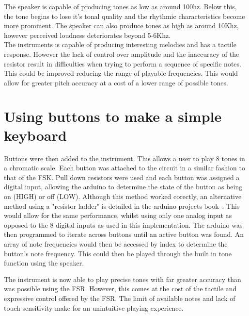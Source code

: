 \documentclass[titlepage]{scrartcl}
\begin{document}
    \begin{figure}[H]
    \end{figure}

    The speaker is capable of producing tones as low as around 100hz. Below
    this, the tone begins to lose it's tonal quality and the rhythmic
    characteristics become more prominent. The speaker can also produce tones
    as high as around 10Khz, however perceived loudness deteriorates beyond
    5-6Khz.\\
    The instruments is capable of producing interesting melodies and has a
    tactile response. However the lack of control over amplitude and the
    inaccuracy of the resistor result in difficulties when trying to perform a
    sequence of specific notes. This could be improved reducing the range of
    playable frequencies. This would allow for greater pitch accuracy at a cost
    of a lower range of possible tones.

    \section{Using buttons to make a simple keyboard}
    Buttons were then added to the instrument. This allows a user to play 8
    tones in a chromatic scale. Each button was attached to the circuit in a
    similar fashion to that of the FSK. Pull down resistors were used and each
    button was assigned a digital input, allowing the arduino to determine the
    state of the button as being on (HIGH) or off (LOW). Although this method
    worked corectly, an alternative method using a "resistor ladder" is
    detailed in the arduino projects book~\parencite[p.79]{arduino2015}. This
    would allow for the same performance, whilst using only one analog input as
    opposed to the 8 digital inputs as used in this implementation.  The
    arduino was then programmed to iterate across buttons until an active
    button was found. An array of note frequencies would then be accessed by
    index to determine the button's note frequency. This could then be played
    through the built in tone function using the speaker.\\

    \begin{figure}[H]
    \end{figure}

    The instrument is now able to play precise tones with far greater accuracy
    than was possible using the FSR. However, this comes at the cost of the
    tactile and expressive control offered by the FSR. The limit of available
    notes and lack of touch sensitivity make for an unintuitive playing
    experience.
\end{document}
